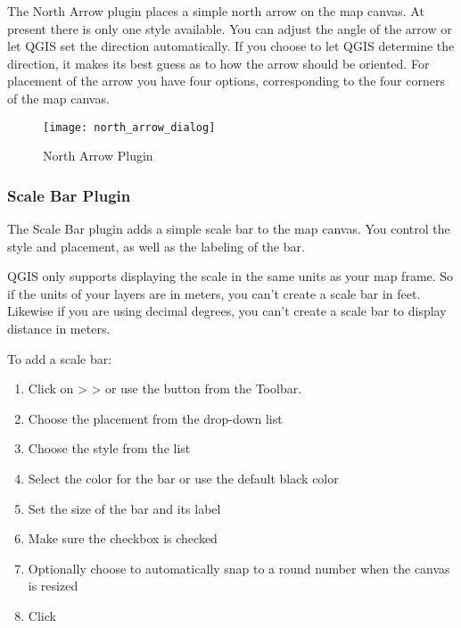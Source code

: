 The North Arrow plugin places a simple north arrow on the map canvas. At
present there is only one style available. You can adjust the angle of the
arrow or let QGIS set the direction automatically. If you choose to let
QGIS determine the direction, it makes its best guess as to how the arrow
should be oriented. For placement of the arrow you have four options, 
corresponding to the four corners of the map canvas.

\begin{figure}[ht]
   \begin{center}
   \caption{North Arrow Plugin \nixcaption}\label{fig:north_arrow}\smallskip
   \texttt{[image: north\_arrow\_dialog]}
\end{center}  
\end{figure}

\subsubsection{Scale Bar Plugin}
The Scale Bar plugin adds a simple scale bar to the map canvas. You
control the style and placement, as well as the labeling of the bar. 

QGIS only supports displaying the scale in the same units as your map frame. So
if the units of your layers are in meters, you can't create a scale bar in
feet. Likewise if you are using decimal degrees, you can't create a scale
bar to display distance in meters.

To add a scale bar:

\begin{enumerate}
\item Click on  >  >  or use the  button from the Toolbar.
\item Choose the placement from the  drop-down list
\item Choose the style from the  list
\item Select the color for the bar  or use the default black color
\item Set the size of the bar and its label 
\item Make sure the  checkbox is checked
\item Optionally choose to automatically snap to a round number when the
  canvas is resized 
\item Click  
\end{enumerate} 

